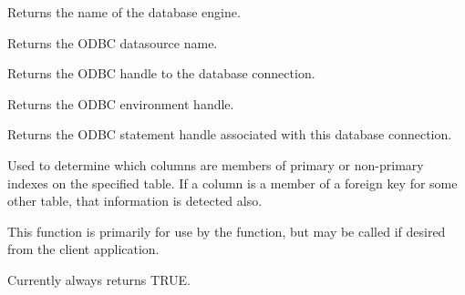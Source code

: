 \label{wxdbgetdatabasename}


Returns the name of the database engine.

\label{wxdbgetdatasource}


Returns the ODBC datasource name.

\label{wxdbgethdbc}


Returns the ODBC handle to the database connection.

\label{wxdbgethenv}


Returns the ODBC environment handle.

\label{wxdbgethstmt}


Returns the ODBC statement handle associated with this database connection.

\label{wxdbgetkeyfields}


Used to determine which columns are members of primary or non-primary indexes on the specified table.  If a column is a member of a foreign key for some other table, that information is detected also.

This function is primarily for use by the  function, but may be called if desired from the client application.




Currently always returns TRUE.

